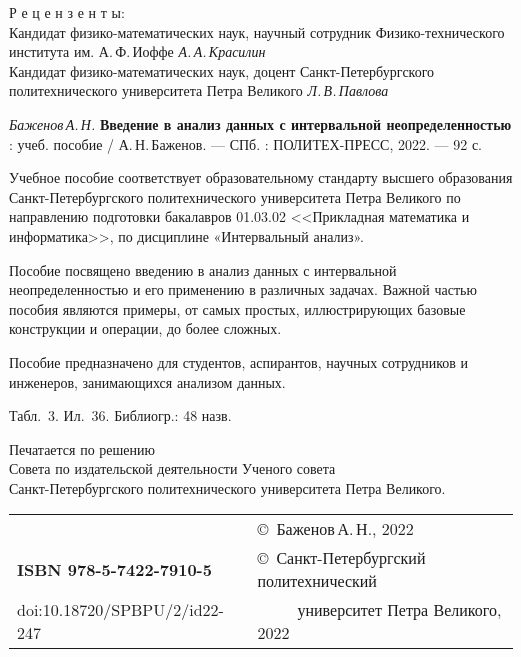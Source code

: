 \documentclass[a5paper,openany]{book}
\begin{document}
{\small







\begin{center}
	Р е ц е н з е н т ы:\\
	
	Кандидат физико-математических наук, научный сотрудник Физико-технического института им. А.\,Ф.\,Иоффе
	{\it А.\,А.\,Красилин}\\
	Кандидат физико-математических наук, доцент Санкт-Петербургского политехнического  университета  Петра Великого {\it Л.\,В.\,Павлова}
\end{center}

{\it Баженов\,А.\,Н.}
{\bf Введение в анализ данных с интервальной неопределенностью} : учеб. пособие /  А.\,Н.\,Баженов.
--- СПб. : ПОЛИТЕХ-ПРЕСС, 2022. --- 92 с.
\hfill \break

{\small 
	Учебное пособие соответствует образовательному стандарту высшего
	образования Санкт-Петербургского политехнического университета Петра Великого по направлению подготовки бакалавров 01.03.02 <<Прикладная математика и информатика>>, по дисциплине «Интервальный анализ».
	
	
	Пособие посвящено введению в анализ данных с интервальной неопределенностью
	и  его применению в различных задачах.  
	Важной частью пособия являются примеры, от самых простых, иллюстрирующих базовые конструкции и операции, до более сложных.

	Пособие предназначено для студентов, аспирантов, научных сотрудников и инженеров, 
	занимающихся анализом данных.
	
	 
	
	
Табл.~3. Ил.~36. Библиогр.: 48 назв.
	\hfill \break
	\hfill \break
	
	\begin{center}
		{\small  	
			Печатается по решению\\
			Совета по издательской деятельности Ученого совета\\
			Санкт-Петербургского политехнического  университета Петра Великого. }
	\end{center}
	
	\hfill \break
	\begin{tabular}{ll}
		~ & \copyright  \ Баженов\,А.\,Н., 2022 \\
{\bf ISBN 978-5-7422-7910-5} & \copyright \
Санкт-Петербургский политехнический \\
doi:10.18720/SPBPU/2/id22-247 & ~~~~~университет Петра Великого, 2022	
\end{tabular}
}	
	
}
\end{document}
